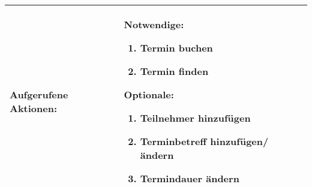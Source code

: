 \begin{tabularx}{\textwidth\footnotesize}{|l*{2}{|X}|}
    \hline
    Aufgerufene Aktionen: & Notwendige: \begin{enumerate}
                                        \item Termin buchen
                                        \item Termin finden
                                            \end{enumerate}
            \linebreak Optionale: \begin{enumerate}
                                      \item Teilnehmer hinzufügen
                                      \item Terminbetreff hinzufügen/ändern
                                        \item Termindauer ändern
                                      \end{enumerate}\\
    \hline
\end{tabularx}
\pagebreak